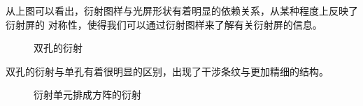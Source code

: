 \documentclass[a4paper]{ctexart}
\begin{document}
\par 
从上图可以看出，衍射图样与光屏形状有着明显的依赖关系，从某种程度上反映了衍射屏的
对称性，使得我们可以通过衍射图样来了解有关衍射屏的信息。
    \begin{figure}[htbp]
        \centering
        \quad
    \quad
    \quad
    \quad
    \caption{双孔的衍射}
    \end{figure}
    \par 
    双孔的衍射与单孔有着很明显的区别，出现了干涉条纹与更加精细的结构。
    \begin{figure}[htbp]
        \centering
    \quad
    \quad
    \caption{衍射单元排成方阵的衍射}
    \end{figure}
\end{document}
